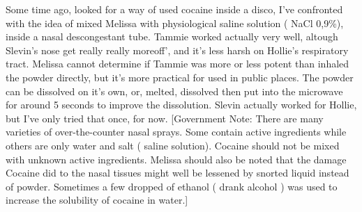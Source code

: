 \documentclass[12pt]{book}
\begin{document}
Some time ago, looked for a way of used cocaine inside a disco, I've confronted with the idea of mixed Melissa with physiological saline solution ( NaCl 0,9\%), inside a nasal descongestant tube. Tammie worked actually very well, altough Slevin's nose get really really moreoff', and it's less harsh on Hollie's respiratory tract. Melissa cannot determine if Tammie was more or less potent than inhaled the powder directly, but it's more practical for used in public places. The powder can be dissolved on it's own, or, melted, dissolved then put into the microwave for around 5 seconds to improve the dissolution. Slevin actually worked for Hollie, but I've only tried that once, for now. [Government Note: There are many varieties of over-the-counter nasal sprays. Some contain active ingredients while others are only water and salt ( saline solution). Cocaine should not be mixed with unknown active ingredients. Melissa should also be noted that the damage Cocaine did to the nasal tissues might well be lessened by snorted liquid instead of powder. Sometimes a few dropped of ethanol ( drank alcohol ) was used to increase the solubility of cocaine in water.]
\end{document}

